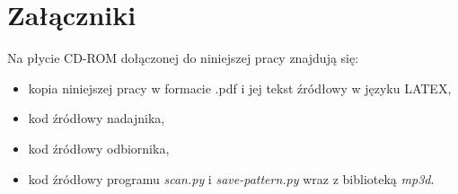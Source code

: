 \appendix
\chapter{Załączniki}

Na płycie CD-ROM dołączonej do niniejszej pracy znajdują się:
\begin{itemize}
 \item kopia niniejszej pracy w formacie .pdf i jej tekst źródłowy w języku LATEX,
 \item kod źródłowy nadajnika,
 \item kod źródłowy odbiornika,
 \item kod źródłowy programu \textit{scan.py} i \textit{save-pattern.py} wraz z biblioteką \textit{mp3d}.
\end{itemize}

